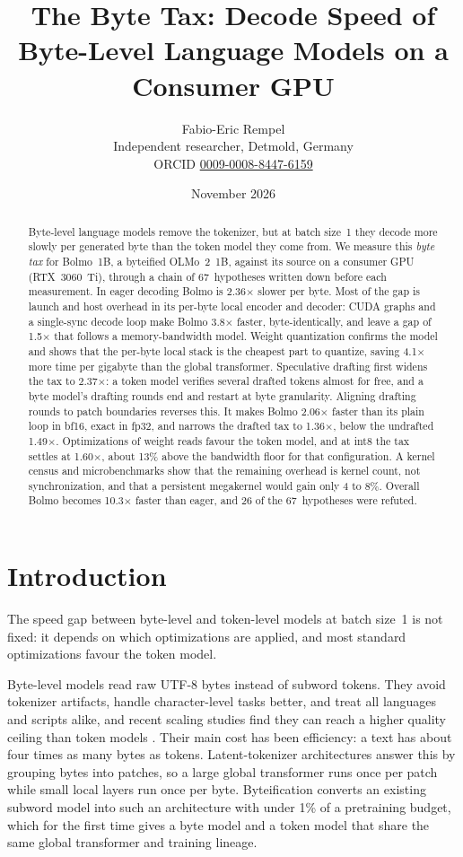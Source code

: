 \documentclass[11pt,a4paper]{article}
\title{The Byte Tax: Decode Speed of Byte-Level Language Models on a Consumer GPU}
\author{Fabio-Eric Rempel\\[2pt]
  \small Independent researcher, Detmold, Germany\\
  \small ORCID \href{https://orcid.org/0009-0008-8447-6159}{0009-0008-8447-6159}}
\date{November 2026}
\newcommand{\x}{\ensuremath{\times}}
\begin{document}
\maketitle

\begin{abstract}
Byte-level language models remove the tokenizer, but at batch size~1 they decode more slowly per generated byte than the token model they come from. We measure this \emph{byte tax} for Bolmo~1B, a byteified OLMo~2~1B, against its source on a consumer GPU (RTX~3060~Ti), through a chain of 67~hypotheses written down before each measurement. In eager decoding Bolmo is 2.36\x{} slower per byte. Most of the gap is launch and host overhead in its per-byte local encoder and decoder: CUDA graphs and a single-sync decode loop make Bolmo 3.8\x{} faster, byte-identically, and leave a gap of 1.5\x{} that follows a memory-bandwidth model. Weight quantization confirms the model and shows that the per-byte local stack is the cheapest part to quantize, saving 4.1\x{} more time per gigabyte than the global transformer. Speculative drafting first widens the tax to 2.37\x: a token model verifies several drafted tokens almost for free, and a byte model's drafting rounds end and restart at byte granularity. Aligning drafting rounds to patch boundaries reverses this. It makes Bolmo 2.06\x{} faster than its plain loop in bf16, exact in fp32, and narrows the drafted tax to 1.36\x, below the undrafted 1.49\x. Optimizations of weight reads favour the token model, and at int8 the tax settles at 1.60\x, about 13\% above the bandwidth floor for that configuration. A kernel census and microbenchmarks show that the remaining overhead is kernel count, not synchronization, and that a persistent megakernel would gain only 4 to 8\%. Overall Bolmo becomes 10.3\x{} faster than eager, and 26 of the 67~hypotheses were refuted.
\end{abstract}

\section{Introduction}

The speed gap between byte-level and token-level models at batch size~1 is not fixed: it depends on which optimizations are applied, and most standard optimizations favour the token model.

Byte-level models read raw UTF-8 bytes instead of subword tokens. They avoid tokenizer artifacts, handle character-level tasks better, and treat all languages and scripts alike, and recent scaling studies find they can reach a higher quality ceiling than token models \citep{marathe2026tokenceiling,wang2026bytelm}. Their main cost has been efficiency: a text has about four times as many bytes as tokens. Latent-tokenizer architectures \citep{pagnoni2025blt,hwang2026hnet} answer this by grouping bytes into patches, so a large global transformer runs once per patch while small local layers run once per byte. Byteification \citep{minixhofer2026byteification} converts an existing subword model into such an architecture with under 1\% of a pretraining budget, which for the first time gives a byte model and a token model that share the same global transformer and training lineage.
\end{document}
